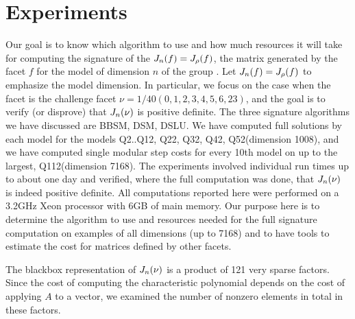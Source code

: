 \documentclass{acm_proc_article-sp}
\begin{document}
%
%
\section{Experiments} %
Our goal is to know which algorithm to use and how much resources it will take 
for computing the signature of the $\M{f}{n} = \M{f}{\rho}$, 
the matrix generated by the facet $f$
for the model of dimension $n$ of the group \EE.  
Let $\M{f}{n} = \M{f}{\rho}$ to emphasize the model dimension. 
In particular, we focus on the case when
the facet is the challenge facet $\nu = 1/40 (0,1,2,3,4,5,6,23)$, 
and the goal is to verify (or disprove) that $\M{\nu}{n}$ is positive definite.  
The three signature algorithms we have discussed are BBSM, DSM, DSLU.
We have computed full solutions by each model for the models Q2..Q12, Q22, Q32, Q42, Q52(dimension 1008),
and we have computed single modular step costs for every 10th model on up to the largest,
Q112(dimension 7168).
The experiments involved individual run times up to about one day and 
verified, where the full computation was done, that $\M{\nu}{n}$ is indeed positive definite.
All computations reported here were performed on a 3.2GHz Xeon processor with 6GB of main memory.
Our purpose here is to determine the algorithm to use and resources needed for the full 
signature computation on examples of all dimensions (up to 7168) and to have tools to 
estimate the cost for matrices defined by other facets.

The blackbox representation of $\M{\nu}{n}$ is a product of 121 very sparse factors.  Since
the cost of computing the characteristic polynomial depends on the cost of applying $A$ to 
a vector, we examined the number of nonzero elements in total in these factors.
\end{document}
